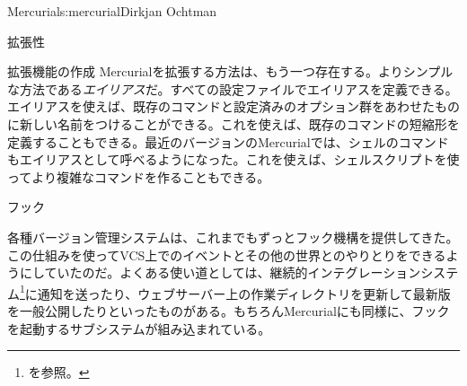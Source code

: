 \begin{aosachapter}{Mercurial}{s:mercurial}{Dirkjan Ochtman}
\begin{aosasect1}{拡張性}
\begin{aosasect2}{拡張機能の作成}
Mercurialを拡張する方法は、もう一つ存在する。よりシンプルな方法である\emph{エイリアス}だ。すべての設定ファイルでエイリアスを定義できる。エイリアスを使えば、既存のコマンドと設定済みのオプション群をあわせたものに新しい名前をつけることができる。これを使えば、既存のコマンドの短縮形を定義することもできる。最近のバージョンのMercurialでは、シェルのコマンドもエイリアスとして呼べるようになった。これを使えば、シェルスクリプトを使ってより複雑なコマンドを作ることもできる。

\end{aosasect2}

\begin{aosasect2}{フック}

各種バージョン管理システムは、これまでもずっとフック機構を提供してきた。この仕組みを使ってVCS上でのイベントとその他の世界とのやりとりをできるようにしていたのだ。よくある使い道としては、継続的インテグレーションシステム\footnote{を参照。}に通知を送ったり、ウェブサーバー上の作業ディレクトリを更新して最新版を一般公開したりといったものがある。もちろんMercurialにも同様に、フックを起動するサブシステムが組み込まれている。


\end{aosasect2}
\end{aosasect1}
\end{aosachapter}

